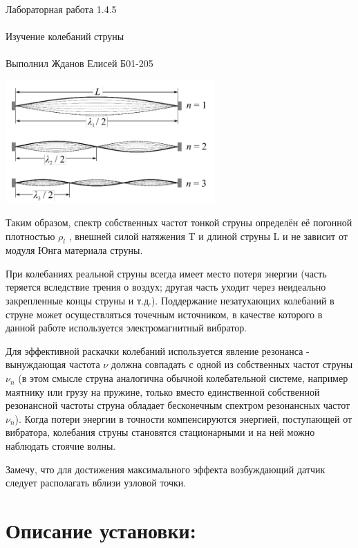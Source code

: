 \documentclass{astroedu-lab}
\begin{document}
\begin{problem}{\huge Лабораторная работа 1.4.5\\\\Изучение колебаний струны\\\\Выполнил Жданов Елисей Б01-205}
\begin{center}
\includegraphics[width=0.6\textwidth]{theory_2.png}
\label{ris:image}
\end{center}

Таким образом, спектр собственных частот тонкой струны определён её погонной плотностью $\rho_l$ , внешней силой натяжения T и длиной
струны L и не зависит от модуля Юнга материала струны.

При колебаниях реальной струны всегда имеет место потеря энергии
(часть теряется вследствие трения о воздух; другая часть уходит через неидеально закрепленные концы струны и т.д.). Поддержание незатухающих колебаний в струне может осуществляться точечным источником, в качестве которого в данной работе используется электромагнитный вибратор.

Для эффективной раскачки колебаний используется явление резонанса - вынуждающая частота $\nu$ должна совпадать с одной из собственных частот струны $\nu_n$ (в этом смысле струна аналогична обычной колебательной системе, например маятнику или грузу на пружине, только вместо единственной собственной резонансной частоты струна обладает бесконечным спектром резонансных частот $\nu_n$). Когда потери энергии в точности компенсируются энергией, поступающей от вибратора, колебания струны становятся стационарными и на ней можно наблюдать стоячие волны.

Замечу, что для достижения максимального эффекта возбуждающий датчик следует располагать вблизи узловой точки. 

\section{Описание установки:}


\end{problem}
\end{document}
